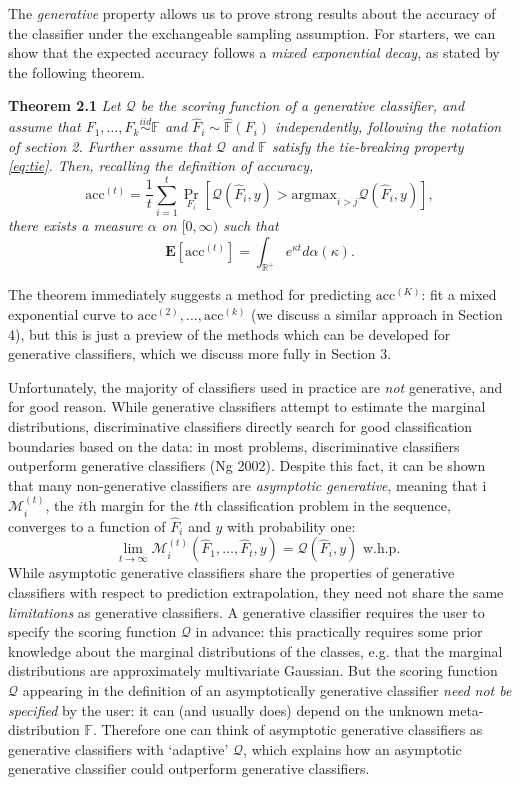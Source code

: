 \documentclass{article}
\newcommand{\E}{\textbf{E}}
\newcommand{\argmax}{\text{argmax}}
\begin{document}
The \emph{generative} property allows us to prove strong results about the accuracy of the classifier
under the exchangeable sampling assumption.  For starters, we can show that the
expected accuracy follows a \emph{mixed exponential decay}, as stated by the following theorem.

\noindent\textbf{Theorem 2.1}
\emph{
Let $\mathcal{Q}$ be the scoring function of a generative classifier, and 
assume that $F_1,\hdots, F_k \stackrel{iid}{\sim} \mathbb{F}$ and $\hat{F}_i \sim \hat{\mathbb{F}}(F_i)$ independently,
following the notation of section 2.
Further assume that $\mathcal{Q}$ and $\mathbb{F}$ satisfy the tie-breaking property \eqref{eq:tie}.
Then, recalling the definition of accuracy,
\[
\text{acc}^{(t)} = \frac{1}{t}\sum_{i=1}^t \Pr_{F_i}[\mathcal{Q}(\hat{F}_i, y) > \argmax_{i > j} \mathcal{Q}(\hat{F}_i, y)],
\]
there exists a measure $\alpha$ on $[0, \infty)$ such that
\[
\E[\text{acc}^{(t)}] = \int_{\mathbb{R}^{+}} e^{\kappa t} d\alpha(\kappa).
\]
}

The theorem immediately suggests a method for predicting $\text{acc}^{(K)}$:
fit a mixed exponential curve to $\text{acc}^{(2)},\hdots, \text{acc}^{(k)}$
(we discuss a similar approach in Section 4),
but this is just a preview of the methods which can be developed for generative classifiers,
which we discuss more fully in Section 3.

Unfortunately, the majority of classifiers used in practice are \emph{not} generative,
and for good reason.  While generative classifiers attempt to estimate the marginal distributions,
discriminative classifiers directly search for good classification boundaries based on the data:
in most problems, discriminative classifiers outperform generative classifiers (Ng 2002).
Despite this fact, it can be shown that many non-generative classifiers are \emph{asymptotic generative},
meaning that i$\mathcal{M}_i^{(t)}$, the $i$th margin for the $t$th classification problem in the sequence,
converges to a function of $\hat{F}_i$ and $y$ with probability one:
\begin{equation}\label{eq:agen}
\lim_{t \to \infty} \mathcal{M}_i^{(t)}(\hat{F}_1,\hdots, \hat{F}_t, y) = \mathcal{Q}(\hat{F}_i, y) \text{ w.h.p. }
\end{equation}
While asymptotic generative classifiers share the properties of generative classifiers with respect to
prediction extrapolation, they need not share the same \emph{limitations} as generative classifiers.
A generative classifier requires the user to specify the scoring function $\mathcal{Q}$ in advance:
this practically requires some prior knowledge about the marginal distributions of the classes,
e.g. that the marginal distributions are approximately multivariate Gaussian.
But the scoring function $\mathcal{Q}$ appearing in the definition of an asymptotically generative classifier
\emph{need not be specified} by the user: 
it can (and usually does) depend on the unknown meta-distribution $\mathbb{F}$.
Therefore one can think of asymptotic generative classifiers as generative classifiers with `adaptive' $\mathcal{Q}$,
which explains how an asymptotic generative classifier could outperform generative classifiers.
\end{document}
